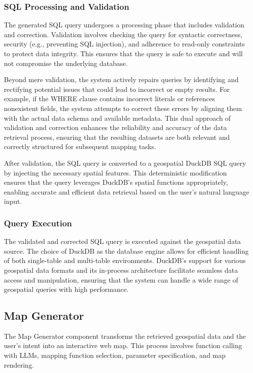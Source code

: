 \subsubsection{SQL Processing and Validation}
The generated SQL query undergoes a processing phase that includes validation and correction. Validation involves checking the query for syntactic correctness, security (e.g., preventing SQL injection), and adherence to read-only constraints to protect data integrity. This ensures that the query is safe to execute and will not compromise the underlying database.

Beyond mere validation, the system actively repairs queries by identifying and rectifying potential issues that could lead to incorrect or empty results. For example, if the WHERE clause contains incorrect literals or references nonexistent fields, the system attempts to correct these errors by aligning them with the actual data schema and available metadata. This dual approach of validation and correction enhances the reliability and accuracy of the data retrieval process, ensuring that the resulting datasets are both relevant and correctly structured for subsequent mapping tasks.

After validation, the SQL query is converted to a geospatial DuckDB SQL query by injecting the necessary spatial features. This deterministic modification ensures that the query leverages DuckDB's spatial functions appropriately, enabling accurate and efficient data retrieval based on the user's natural language input.

\subsubsection{Query Execution}
The validated and corrected SQL query is executed against the geospatial data source. The choice of DuckDB as the database engine allows for efficient handling of both single-table and multi-table environments. DuckDB's support for various geospatial data formats and its in-process architecture facilitate seamless data access and manipulation, ensuring that the system can handle a wide range of geospatial queries with high performance.

\subsection{Map Generator}
The Map Generator component transforms the retrieved geospatial data and the user's intent into an interactive web map. This process involves function calling with LLMs, mapping function selection, parameter specification, and map rendering.


